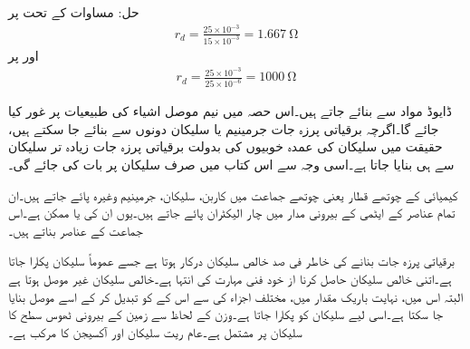 حل:	مساوات   کے تحت  پر
\begin{align}
r_d =\frac{25 \times 10^{-3}}{15 \times 10^{-3}}=\SI{1.667}{\ohm}
\end{align}
اور  پر
\begin{align}
r_d =\frac{25 \times 10^{-3}}{25 \times 10^{-6}}=\SI{1000}{\ohm}
\end{align}

 ڈایوڈ  مواد سے بنائے جاتے ہیں۔اس حصہ میں نیم موصل اشیاء کی طبیعیات پر غور کیا جائے گا۔اگرچہ برقیاتی پرزہ جات جرمینیم یا سلیکان دونوں سے بنائے جا سکتے ہیں، حقیقت میں سلیکان کی عمدہ خوبیوں کی بدولت برقیاتی پرزہ جات زیادہ تر سلیکان سے ہی بنایا جاتا ہے۔اسی وجہ سے اس کتاب میں صرف سلیکان پر بات کی جائے گی۔

کیمیائی   کے چوتھے قطار یعنی چوتھے جماعت  میں کاربن، سلیکان، جرمینیم وغیرہ پائے جاتے ہیں۔ان تمام عناصر کے ایٹمی   کے بیرونی مدار میں چار الیکٹران  پائے جاتے ہیں۔یوں ان کی        یا  ممکن ہے۔اس جماعت کے عناصر   بناتے ہیں۔

برقیاتی پرزہ جات بنانے کی خاطر  فی صد خالص سلیکان درکار ہوتا ہے جسے عموماً  سلیکان پکارا جاتا ہے۔اتنی خالص سلیکان حاصل کرنا از خود فنی مہارت کی انتہا ہے۔خالص سلیکان غیر موصل ہوتا ہے البتہ اس میں، نہایت باریک مقدار میں، مختلف اجزاء کی   سے اس کے  کو تبدیل کر کے اسے موصل بنایا جا سکتا ہے۔اسی لیے سلیکان کو   پکارا جاتا ہے۔وزن کے لحاظ سے زمین کے بیرونی ٹھوس سطح کا  سلیکان پر مشتمل ہے۔عام ریت سلیکان اور آکسیجن کا مرکب  ہے۔

